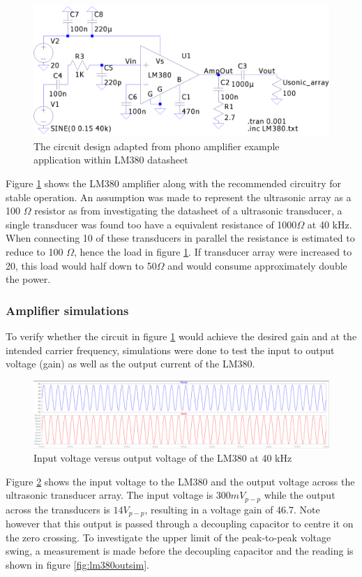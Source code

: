 \begin{figure}[ht!]
    \centering
    \includegraphics[width=\textwidth]{Figures/Design/amplifier/lm380circwhitestable.png}
    \caption{The circuit design adapted from phono amplifier example application within LM380 datasheet}
    \label{fig:lm380circ}
\end{figure}

Figure \ref{fig:lm380circ} shows the LM380 amplifier along with the recommended circuitry for stable operation. An assumption was made to represent the ultrasonic array as a 100 $\Omega$ resistor as from investigating the datasheet of a ultrasonic transducer, a single transducer was found too have a equivalent resistance of 1000$\Omega$ at 40 kHz. When connecting 10 of these transducers in parallel the resistance is estimated to reduce to 100 $\Omega$, hence the load in figure \ref{fig:lm380circ}. If transducer array were increased to 20, this load would half down to 50$\Omega$ and would consume approximately double the power.

\subsubsection{Amplifier simulations}
To verify whether the circuit in figure \ref{fig:lm380circ} would achieve the desired gain and at the intended carrier frequency, simulations were done to test the input to output voltage (gain) as well as the output current of the LM380.

\begin{figure}[ht!]
    \centering
    \includegraphics[width=\textwidth]{Figures/Design/amplifier/vinvout.png}
    \caption{Input voltage versus output voltage of the LM380 at 40 kHz}
    \label{fig:lm380inoutsim}
\end{figure}
Figure \ref{fig:lm380inoutsim} shows the input voltage to the LM380 and the output voltage across the ultrasonic transducer array. The input voltage is $300mV_{p-p}$ while the output across the transducers is $14V_{p-p}$, resulting in a voltage gain of 46.7. Note however that this output is passed through a decoupling capacitor to centre it on the zero crossing. To investigate the upper limit of the peak-to-peak voltage swing, a measurement is made before the decoupling capacitor and the reading is shown in figure \ref{fig:lm380outsim}.


